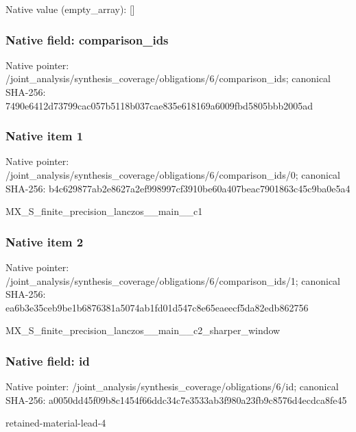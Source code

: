 \documentclass[10pt,a4paper]{article}
\begin{document}
Native value (empty\_\allowbreak{}array): []

\subsubsection{Native field: comparison\_\allowbreak{}ids}
Native pointer: /joint\_\allowbreak{}analysis/synthesis\_\allowbreak{}coverage/obligations/6/comparison\_\allowbreak{}ids; canonical SHA-256: 7490e6412d73799cac057b5118b037cae835e618169a6009fbd5805bbb2005ad

\subsubsection{Native item 1}
Native pointer: /joint\_\allowbreak{}analysis/synthesis\_\allowbreak{}coverage/obligations/6/comparison\_\allowbreak{}ids/0; canonical SHA-256: b4c629877ab2e8627a2ef998997cf3910be60a407beac7901863c45c9ba0e5a4

\begingroup\raggedright\sloppy MX\_\allowbreak{}S\_\allowbreak{}finite\_\allowbreak{}precision\_\allowbreak{}lanczos\_\allowbreak{}\_\allowbreak{}main\_\allowbreak{}\_\allowbreak{}c1\par\endgroup

\subsubsection{Native item 2}
Native pointer: /joint\_\allowbreak{}analysis/synthesis\_\allowbreak{}coverage/obligations/6/comparison\_\allowbreak{}ids/1; canonical SHA-256: ea6b3e35ceb9be1b6876381a5074ab1fd01d547c8e65eaeecf5da82edb862756

\begingroup\raggedright\sloppy MX\_\allowbreak{}S\_\allowbreak{}finite\_\allowbreak{}precision\_\allowbreak{}lanczos\_\allowbreak{}\_\allowbreak{}main\_\allowbreak{}\_\allowbreak{}c2\_\allowbreak{}sharper\_\allowbreak{}window\par\endgroup

\subsubsection{Native field: id}
Native pointer: /joint\_\allowbreak{}analysis/synthesis\_\allowbreak{}coverage/obligations/6/id; canonical SHA-256: a0050dd45f09b8c1454f66ddc34c7e3533ab3f980a23fb9c8576d4ecdca8fe45

\begingroup\raggedright\sloppy retained-material-lead-4\par\endgroup
\end{document}
